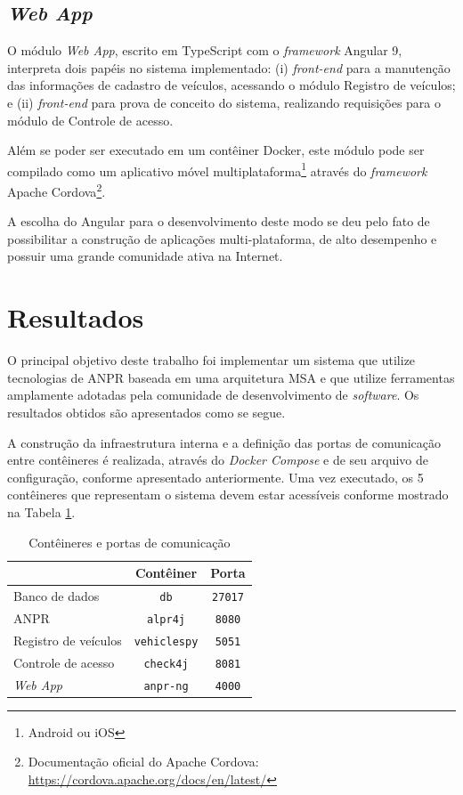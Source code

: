 \documentclass[12pt]{article}
\begin{document}
\subsection{\textit{Web App}}

O módulo \textit{Web App}, escrito em TypeScript com o \textit{framework} Angular 9, interpreta dois papéis no sistema implementado: (i) \textit{front-end} para a manutenção das informações de cadastro de veículos, acessando o módulo Registro de veículos; e (ii) \textit{front-end} para prova de conceito do sistema, realizando requisições para o módulo de Controle de acesso.

Além se poder ser executado em um contêiner Docker, este módulo pode ser compilado como um aplicativo móvel multiplataforma\footnote{Android ou iOS} através do \textit{framework} Apache Cordova\footnote{Documentação oficial do Apache Cordova: \url{https://cordova.apache.org/docs/en/latest/}}.

A escolha do Angular para o desenvolvimento deste modo se deu pelo fato de possibilitar a construção de aplicações multi-plataforma, de alto desempenho e possuir uma grande comunidade ativa na Internet.

\section{Resultados}

O principal objetivo deste trabalho foi implementar um sistema que utilize tecnologias de ANPR baseada em uma arquitetura MSA e que utilize ferramentas amplamente adotadas pela comunidade de desenvolvimento de \textit{software}. Os resultados obtidos são apresentados como se segue.

A construção da infraestrutura interna e a definição das portas de comunicação entre contêineres é realizada, através do \textit{Docker Compose} e de seu arquivo de configuração, conforme apresentado anteriormente. Uma vez executado, os 5 contêineres que representam o sistema devem estar acessíveis conforme mostrado na Tabela \ref{table:container-table}.

\begin{table}[h!]
	\begin{center}
		\begin{tabular}{l|c|c}
			\hline
			\space & \textbf{Contêiner} & \textbf{Porta}\\
			\hline
			Banco de dados & \texttt{db} & \texttt{27017}\\
			ANPR & \texttt{alpr4j} & \texttt{8080}\\
			Registro de veículos & \texttt{vehiclespy} & \texttt{5051}\\
			Controle de acesso & \texttt{check4j} & \texttt{8081}\\
			\textit{Web App} & \texttt{anpr-ng} & \texttt{4000}\\
			\hline
		\end{tabular}
	\caption{Contêineres e portas de comunicação}
	\label{table:container-table}
	\end{center}
\end{table}
\end{document}
